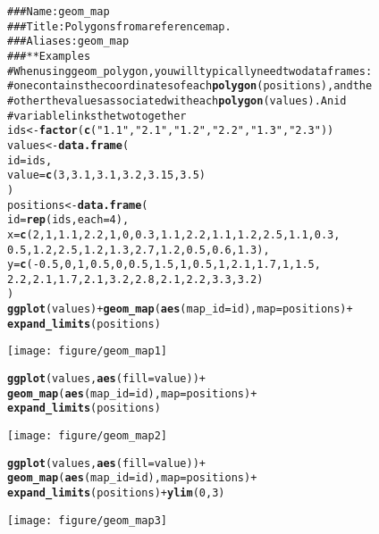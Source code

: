 \documentclass[a4paper,titlepage]{tufte-handout}\usepackage{graphicx, color}
\makeatletter
\def\maxwidth{ %
  \ifdim\Gin@nat@width>\linewidth
    \linewidth
  \else
    \Gin@nat@width
  \fi
}
\newcommand{\hlfunctioncall}[1]{\textcolor[rgb]{0.501960784313725,0,0.329411764705882}{\textbf{#1}}}%
\newcommand{\hlstring}[1]{\textcolor[rgb]{0.6,0.6,1}{#1}}%
\newcommand{\hlcomment}[1]{\textcolor[rgb]{0.180392156862745,0.6,0.341176470588235}{#1}}%
\newenvironment{kframe}{%
 \def\at@end@of@kframe{}%
 \ifinner\ifhmode%
  \def\at@end@of@kframe{\end{minipage}}%
  \begin{minipage}{\columnwidth}%
 \fi\fi%
 \def\FrameCommand##1{\hskip\@totalleftmargin \hskip-\fboxsep
 \colorbox{shadecolor}{##1}\hskip-\fboxsep
     \hskip-\linewidth \hskip-\@totalleftmargin \hskip\columnwidth}%
 \MakeFramed {\advance\hsize-\width
   \@totalleftmargin\z@ \linewidth\hsize
   \@setminipage}}%
 {\par\unskip\endMakeFramed%
 \at@end@of@kframe}
\newenvironment{knitrout}{}{} %
\makeatother
\begin{document}
\begin{knitrout}
\color{fgcolor}\begin{kframe}
\begin{alltt}
\hlcomment{### Name: geom_map}
\hlcomment{### Title: Polygons from a reference map.}
\hlcomment{### Aliases: geom_map}
\hlcomment{### ** Examples}
\hlcomment{# When using geom_polygon, you will typically need two data frames:}
\hlcomment{# one contains the coordinates of each \hlfunctioncall{polygon} (positions),  and the}
\hlcomment{# other the values associated with each \hlfunctioncall{polygon} (values).  An id}
\hlcomment{# variable links the two together}
ids <- \hlfunctioncall{factor}(\hlfunctioncall{c}(\hlstring{"1.1"}, \hlstring{"2.1"}, \hlstring{"1.2"}, \hlstring{"2.2"}, \hlstring{"1.3"}, \hlstring{"2.3"}))
values <- \hlfunctioncall{data.frame}(
  id = ids,
  value = \hlfunctioncall{c}(3, 3.1, 3.1, 3.2, 3.15, 3.5)
)
positions <- \hlfunctioncall{data.frame}(
  id = \hlfunctioncall{rep}(ids, each = 4),
  x = \hlfunctioncall{c}(2, 1, 1.1, 2.2, 1, 0, 0.3, 1.1, 2.2, 1.1, 1.2, 2.5, 1.1, 0.3,
  0.5, 1.2, 2.5, 1.2, 1.3, 2.7, 1.2, 0.5, 0.6, 1.3),
  y = \hlfunctioncall{c}(-0.5, 0, 1, 0.5, 0, 0.5, 1.5, 1, 0.5, 1, 2.1, 1.7, 1, 1.5,
  2.2, 2.1, 1.7, 2.1, 3.2, 2.8, 2.1, 2.2, 3.3, 3.2)
)
\hlfunctioncall{ggplot}(values) + \hlfunctioncall{geom_map}(\hlfunctioncall{aes}(map_id = id), map = positions) +
  \hlfunctioncall{expand_limits}(positions)
\end{alltt}
\end{kframe}\texttt{[image: figure/geom\_map1]} \begin{kframe}\begin{alltt}
\hlfunctioncall{ggplot}(values, \hlfunctioncall{aes}(fill = value)) +
  \hlfunctioncall{geom_map}(\hlfunctioncall{aes}(map_id = id), map = positions) +
  \hlfunctioncall{expand_limits}(positions)
\end{alltt}
\end{kframe}\texttt{[image: figure/geom\_map2]} \begin{kframe}\begin{alltt}
\hlfunctioncall{ggplot}(values, \hlfunctioncall{aes}(fill = value)) +
  \hlfunctioncall{geom_map}(\hlfunctioncall{aes}(map_id = id), map = positions) +
  \hlfunctioncall{expand_limits}(positions) + \hlfunctioncall{ylim}(0, 3)
\end{alltt}
\end{kframe}\texttt{[image: figure/geom\_map3]} \begin{kframe}\begin{alltt}

\end{alltt}
\end{kframe}
\end{knitrout}
\end{document}
